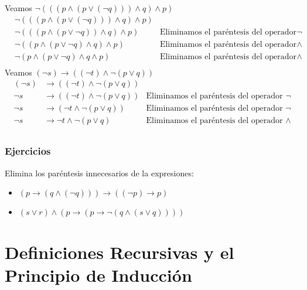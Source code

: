 \documentclass[a4paper]{article}
\begin{document}
Veamos \(\neg\left(\left(\left(p \land \left(p \lor \left(\neg q\right)\right)\right) \land q \right) \land p\right)\)
\begin{align*}
    &\neg\left(\left(\left(p \land \left(p \lor \left(\neg q\right)\right)\right) \land q \right) \land p\right) & \\
    &\neg\left(\left(\left(p \land \left(p \lor \neg q\right)\right) \land q \right) \land p\right) & \text{Eliminamos el paréntesis del operador \(\neg\)}\\
    &\neg\left(\left(p \land \left(p \lor \neg q\right) \land q \right) \land p\right) & \text{Eliminamos el paréntesis del operador \(\land\)}\\
    &\neg\left(p \land \left(p \lor \neg q\right) \land q \land p\right) & \text{Eliminamos el paréntesis del operador \(\land\)}\\
\end{align*}
Veamos \(\left(\neg s\right) \rightarrow \left(\left(\neg t\right) \land \neg \left(p \lor q\right) \right)\)
\begin{align*}
    \left(\neg s\right) &\rightarrow \left(\left(\neg t\right) \land \neg \left(p \lor q\right) \right) &\\
    \neg s &\rightarrow \left(\left(\neg t\right) \land \neg \left(p \lor q\right) \right) & \text{Eliminamos el paréntesis del operador \(\neg\)} \\
    \neg s &\rightarrow \left(\neg t \land \neg \left(p \lor q\right) \right) & \text{Eliminamos el paréntesis del operador \(\neg\)} \\
    \neg s &\rightarrow \neg t \land \neg \left(p \lor q\right) & \text{Eliminamos el paréntesis del operador \(\land\)} \\
\end{align*}
\subsubsection{Ejercicios}
\noindent
Elimina los paréntesis innecesarios de la expresiones:
\begin{itemize}
    \item \(\left(p \rightarrow \left(q \land \left(\neg q\right)\right)\right) \rightarrow \left(\left(\neg p\right) \rightarrow p\right)\)
    \item \(\left(s \lor r\right) \land \left(p \rightarrow \left(p \rightarrow \neg \left(q \land \left(s \lor q\right)\right)\right)\right)\)
\end{itemize}
\section{Definiciones Recursivas y el Principio de Inducción}
\end{document}
